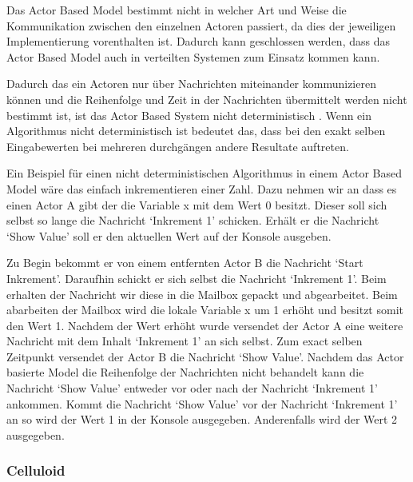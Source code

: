 Das Actor Based Model bestimmt nicht in welcher Art und Weise die Kommunikation zwischen den einzelnen Actoren passiert, da dies der jeweiligen Implementierung vorenthalten ist. Dadurch kann geschlossen werden, dass das Actor Based Model auch in verteilten Systemen zum Einsatz kommen kann.

Dadurch das ein Actoren nur über Nachrichten miteinander kommunizieren können und die Reihenfolge und Zeit in der Nachrichten übermittelt werden nicht bestimmt ist, ist das Actor Based System nicht deterministisch \cite[]{Agh85}. Wenn ein Algorithmus nicht deterministisch ist bedeutet das, dass bei den exakt selben Eingabewerten bei mehreren durchgängen andere Resultate auftreten.

Ein Beispiel für einen nicht deterministischen Algorithmus in einem Actor Based Model wäre das einfach inkrementieren einer Zahl. Dazu nehmen wir an dass es einen Actor A gibt der die Variable x mit dem Wert 0 besitzt. Dieser soll sich selbst so lange die Nachricht `Inkrement 1' schicken. Erhält er die Nachricht `Show Value' soll er den aktuellen Wert auf der Konsole ausgeben.

Zu Begin bekommt er von einem entfernten Actor B die Nachricht `Start Inkrement'. Daraufhin schickt er sich selbst die Nachricht `Inkrement 1'. Beim erhalten der Nachricht wir diese in die Mailbox gepackt und abgearbeitet. Beim abarbeiten der Mailbox wird die lokale Variable x um 1 erhöht und besitzt somit den Wert 1. Nachdem der Wert erhöht wurde versendet der Actor A eine weitere Nachricht mit dem Inhalt `Inkrement 1' an sich selbst. Zum exact selben Zeitpunkt versendet der Actor B die Nachricht `Show Value'. Nachdem das Actor basierte Model die Reihenfolge der Nachrichten nicht behandelt kann die Nachricht `Show Value' entweder vor oder nach der Nachricht `Inkrement 1' ankommen. Kommt die Nachricht `Show Value' vor der Nachricht `Inkrement 1' an so wird der Wert 1 in der Konsole ausgegeben. Anderenfalls wird der Wert 2 ausgegeben.

\subsubsection{Celluloid}
